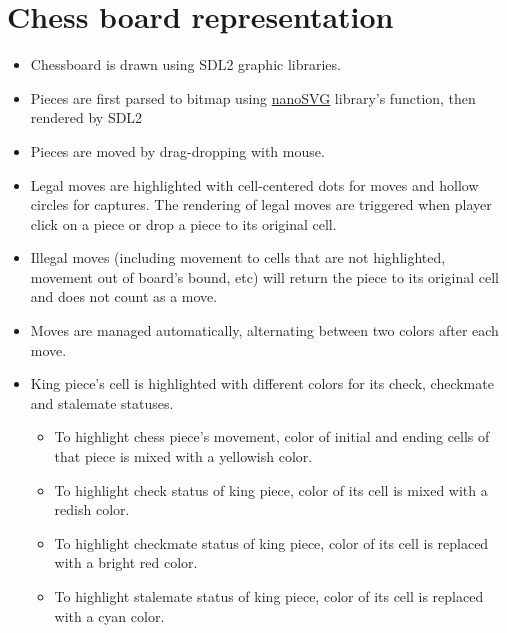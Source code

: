 \documentclass[a4paper, 10pt, titlepage]{report}
\begin{document}
\section{Chess board representation}
\begin{itemize}
  \item Chessboard is drawn using SDL2 graphic libraries.
  \item Pieces are first parsed to bitmap using \href{https://github.com/memononen/nanosvg}{nanoSVG} library's function, then rendered by SDL2
  \item Pieces are moved by drag-dropping with mouse.
  \item Legal moves are highlighted with cell-centered dots for moves and hollow circles for captures. The rendering of legal moves are triggered when player click on a piece or drop a piece to its original cell.
  \item Illegal moves (including movement to cells that are not highlighted, movement out of board's bound, etc) will return the piece to its original cell and does not count as a move.
  \item Moves are managed automatically, alternating between two colors after each move.
  \item King piece's cell is highlighted with different colors for its check, checkmate and stalemate statuses.
        \begin{itemize}
          \item To highlight chess piece's movement, color of initial and ending cells of that piece is mixed with a yellowish color.
          \item To highlight check status of king piece, color of its cell is mixed with a redish color.
          \item To highlight checkmate status of king piece, color of its cell is replaced with a bright red color.
          \item To highlight stalemate status of king piece, color of its cell is replaced with a cyan color.
        \end{itemize}
\end{itemize}
\end{document}
